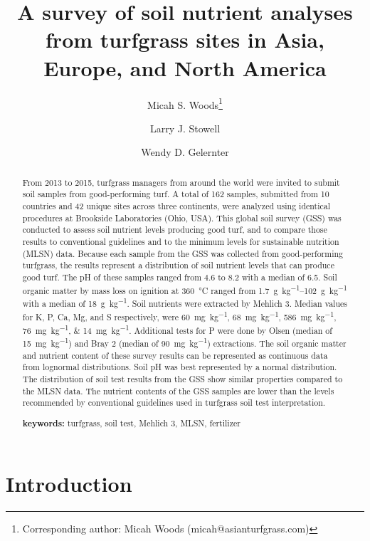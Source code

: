 \documentclass[12pt, a4paper, titlepage]{article}
\title{A survey of soil nutrient analyses from turfgrass sites in Asia, Europe, and North America}
\author[1]{Micah S. Woods\thanks{Corresponding author: Micah Woods (micah@asianturfgrass.com)}}
\author[2]{Larry J. Stowell}
\author[2]{Wendy D. Gelernter}
\affil[1]{Asian Turfgrass Center, Bangkok, Thailand}
\affil[2]{PACE Turf, San Diego, California}
\date{}
\renewcommand{\thefootnote}{\fnsymbol{footnote}} %
\begin{document}
\maketitle

\renewcommand{\thefootnote}{\arabic{footnote}} %

\begin{abstract}

From 2013 to 2015, turfgrass managers from around the world were invited to submit soil samples from good-performing turf. A total of 162 samples, submitted from 10 countries and 42 unique sites across three continents, were analyzed using identical procedures at Brookside Laboratories (Ohio, USA). This global soil survey (GSS) was conducted to assess soil nutrient levels producing good turf, and to compare those results to conventional guidelines and to the minimum levels for sustainable nutrition (MLSN) data. Because each sample from the GSS was collected from good-performing turfgrass, the results represent a distribution of soil nutrient levels that can produce good turf. The pH of these samples ranged from 4.6 to 8.2 with a median of 6.5. Soil organic matter by mass loss on ignition at \SI{360}{\celsius} ranged from \SIrange{1.7}{102}{\gram\per\kg} with a median of \SI{18}{\gram\per\kg}. Soil nutrients were extracted by Mehlich 3. Median values for K, P, Ca, Mg, and S respectively, were \SIlist[list-units = single]{60; 68; 586; 76; 14}{\mg\per\kg}. Additional tests for P were done by Olsen (median of \SI{15}{\mg\per\kg}) and Bray 2 (median of \SI{90}{\mg\per\kg}) extractions. The soil organic matter and nutrient content of these survey results can be represented as continuous data from lognormal distributions. Soil pH was best represented by a normal distribution. The distribution of soil test results from the GSS show similar properties compared to the MLSN data. The nutrient contents of the GSS samples are lower than the levels recommended by conventional guidelines used in turfgrass soil test interpretation.

\vspace{0.5cm}

\textbf{keywords:} turfgrass, soil test, Mehlich 3, MLSN, fertilizer

\end{abstract}

\section*{Introduction}
\end{document}

